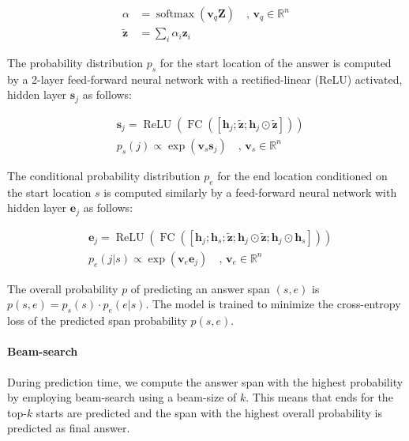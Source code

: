 \documentclass[11pt,a4paper]{article}
\begin{document}
\begin{align}
    \alpha &= \operatorname{softmax}(\boldsymbol{v}_q \boldsymbol{Z}) \quad , \, \boldsymbol{v}_q \in \mathbb{R}^n \nonumber \\
    \boldsymbol{\tilde{z}} &= \sum_i \alpha_i \boldsymbol{z}_i \label{eq:question_representation}
\end{align}

The probability distribution $p_s$ for the start location of the answer is computed by a 2-layer feed-forward neural network with a rectified-linear (ReLU) activated, hidden layer $\boldsymbol{s}_j$ as follows:

\begin{align}
    &\boldsymbol{s}_j = \operatorname{ReLU}  \left(\operatorname{FC}\left( \left[ \boldsymbol{h}_j ; \boldsymbol{\tilde{z}} ; \boldsymbol{h}_j \odot \boldsymbol{\tilde{z}} \right] \right) \right) \nonumber \\
    &p_{s}(j) \propto \exp(\boldsymbol{v}_s \boldsymbol{s}_j) \quad , \, \boldsymbol{v}_s \in \mathbb{R}^n
\end{align}

The conditional probability distribution $p_e$ for the end location conditioned on the start location $s$ is computed similarly by a feed-forward neural network with hidden layer $\boldsymbol{e}_j$ as follows:

\begin{align}
    &\boldsymbol{e}_j = \operatorname{ReLU} \left(\operatorname{FC}\left( \left[ \boldsymbol{h}_j ; \boldsymbol{h}_s  ; \boldsymbol{\tilde{z}} ; \boldsymbol{h}_j \odot \boldsymbol{\tilde{z}} ; \boldsymbol{h}_j \odot \boldsymbol{h}_s  \right] \right) \right) \nonumber \\
    &p_{e}(j|s) \propto \exp(\boldsymbol{v}_e \boldsymbol{e}_j) \quad , \, \boldsymbol{v}_e \in \mathbb{R}^n
\end{align}

The overall probability $p$ of predicting an answer span $(s,e)$ is $p(s,e) = p_s(s) \cdot p_e(e|s)$. The model is trained to minimize the cross-entropy loss of the predicted span probability $p(s,e)$.

\paragraph{Beam-search} During prediction time, we compute the answer span with the highest probability by employing beam-search using a beam-size of $k$. This means that ends for the top-$k$ starts are predicted and the span with the highest overall probability is predicted as final answer.
\end{document}
